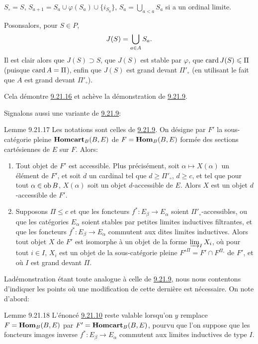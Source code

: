 \documentclass[10pt]{../fichiers-configuration-latex/smfart}
\def\labelenumi{(\theenumi)}
\begin{document}
$S_{\circ}=S$, $S_{a+1}=S_a\cup \varphi(S_a)\cup\{i_{S_a}\}$,
$S_a=\bigcup_{a<a}S_a$ si a un ordinal limite.

Posons\pageoriginale alors, pour $S\in P$,
$$
J(S)=\bigcup_{a\in A}S_a{}.
$$
Il est clair alors que $J(S)\supset S$, que $J(S)$ est stable par
$\varphi$, que $\operatorname{card} J(S)\leqslant \Pi$ (puisque $\operatorname{card} A=\Pi$), enfin
que $J(S)$ est grand devant $\Pi'_{\circ}$ (en utilisant le fait que
$A$ est grand devant $\Pi'_{\circ}$).

Cela démontre \hyperref[I.lem9.21.16]{9.21.16} et achève la
démonstration de \hyperref[I.lem9.21.9]{9.21.9}.

Signalons aussi une variante de \hyperref[I.lem9.21.9]{9.21.9}:

\begin{enonce*}{Lemme 9.21.17}
Les notations sont celles de \hyperref[I.lem9.21.9]{9.21.9}. On désigne par $F'$ la
sous-catégorie pleine $\operatorname{\mathbf{Homcart}}_B(B,E)$ de $F=\operatorname{\mathbf{Hom}}_B(B,E)$ formée
des sections cartésiennes de $E$ sur $F$. Alors:
\begin{enumerate}
\renewcommand{\theenumi}{\roman{enumi}}
\renewcommand{\labelenumi}{(\theenumi)}
\item Tout objet de $F'$ est accessible. Plus précisément, soit
$\alpha\mapsto X(\alpha)$ un élément de $F'$, et soit $d$ un
cardinal tel que $d\geq \Pi'_{\circ}$, $d\geq c$, et tel que pour
tout $\alpha\in \operatorname{ob} B$, $X(\alpha)$ soit un objet $d$-accessible de
$E$. Alors $X$ est un objet $d$-accessible de $F'$.

\item Supposons $\Pi\leq c$ et que les foncteurs
$f^\ast:E_{\beta}\rightarrow E_{\alpha}$ soient
$\Pi'_{\circ}$-accessibles, ou que les catégories $E_{\alpha}$
soient stables par petites limites inductives filtrantes, et que les
foncteurs $f^\ast:E_{\beta}\rightarrow E_{\alpha}$ commutent aux
dites limites inductives. Alors tout objet $X$ de $F'$ est isomorphe
à un objet de la forme $\varinjlim_I X_i$, où pour tout $i\in I$,
$X_i$ est un objet de la sous-catégorie pleine ${F'}^{\Pi}=F'\cap
F^{\Pi_{\circ}}$ de $F'$, et où $I$ est grand devant $\Pi$.
\end{enumerate}
\end{enonce*}

La\pageoriginale démonstration étant toute analogue à celle de
\hyperref[I.lem9.21.9]{9.21.9}, nous nous contentons d'indiquer les points où une
modification de cette dernière est nécessaire. On note d'abord:

\begin{enonce*}{Lemme 9.21.18}
L'énoncé \hyperref[I.lem9.21.10]{9.21.10} reste valable lorsqu'on $y$ remplace
$F=\operatorname{\mathbf{Hom}}_B(B,E)$ par $F'=\operatorname{\mathbf{Homcart}}_B(B,E)$, pourvu que l'on suppose
que les foncteurs images inverse $f^\ast:E_{\beta}\rightarrow
E_{\alpha}$ commutent aux limites inductives de type $I$.
\end{enonce*}
\end{document}
